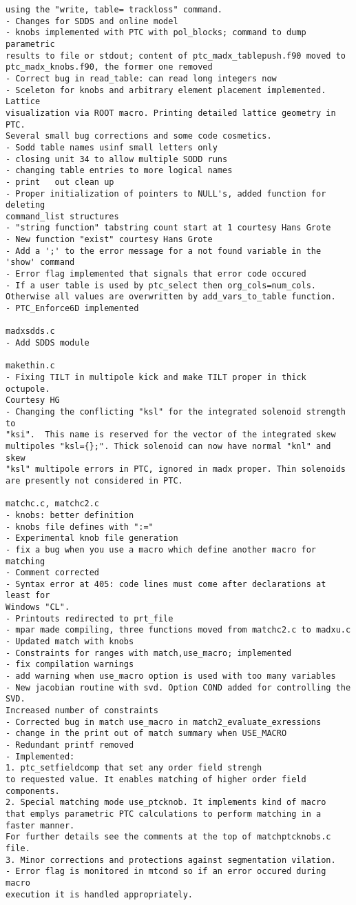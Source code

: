 \begin{verbatim}
using the "write, table= trackloss" command.
- Changes for SDDS and online model
- knobs implemented with PTC with pol_blocks; command to dump parametric 
results to file or stdout; content of ptc_madx_tablepush.f90 moved to 
ptc_madx_knobs.f90, the former one removed
- Correct bug in read_table: can read long integers now
- Sceleton for knobs and arbitrary element placement implemented. Lattice 
visualization via ROOT macro. Printing detailed lattice geometry in PTC. 
Several small bug corrections and some code cosmetics.
- Sodd table names usinf small letters only
- closing unit 34 to allow multiple SODD runs
- changing table entries to more logical names
- print   out clean up
- Proper initialization of pointers to NULL's, added function for deleting 
command_list structures
- "string function" tabstring count start at 1 courtesy Hans Grote
- New function "exist" courtesy Hans Grote
- Add a ';' to the error message for a not found variable in the 'show' command
- Error flag implemented that signals that error code occured
- If a user table is used by ptc_select then org_cols=num_cols. 
Otherwise all values are overwritten by add_vars_to_table function.
- PTC_Enforce6D implemented

madxsdds.c
- Add SDDS module

makethin.c
- Fixing TILT in multipole kick and make TILT proper in thick octupole.
Courtesy HG
- Changing the conflicting "ksl" for the integrated solenoid strength to
"ksi".  This name is reserved for the vector of the integrated skew
multipoles "ksl={};". Thick solenoid can now have normal "knl" and skew
"ksl" multipole errors in PTC, ignored in madx proper. Thin solenoids
are presently not considered in PTC.

matchc.c, matchc2.c
- knobs: better definition
- knobs file defines with ":="
- Experimental knob file generation
- fix a bug when you use a macro which define another macro for matching
- Comment corrected
- Syntax error at 405: code lines must come after declarations at least for
Windows "CL".
- Printouts redirected to prt_file
- mpar made compiling, three functions moved from matchc2.c to madxu.c
- Updated match with knobs
- Constraints for ranges with match,use_macro; implemented
- fix compilation warnings
- add warning when use_macro option is used with too many variables
- New jacobian routine with svd. Option COND added for controlling the SVD. 
Increased number of constraints
- Corrected bug in match use_macro in match2_evaluate_exressions
- change in the print out of match summary when USE_MACRO
- Redundant printf removed
- Implemented:
1. ptc_setfieldcomp that set any order field strengh
to requested value. It enables matching of higher order field components.
2. Special matching mode use_ptcknob. It implements kind of macro
that emplys parametric PTC calculations to perform matching in a faster manner.
For further details see the comments at the top of matchptcknobs.c file.
3. Minor corrections and protections against segmentation vilation.
- Error flag is monitored in mtcond so if an error occured during macro 
execution it is handled appropriately.


\end{verbatim}
